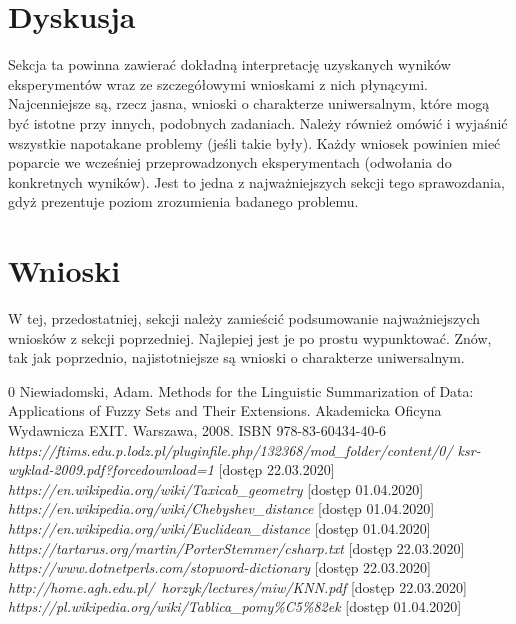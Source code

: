 \documentclass{classrep}
\begin{document}
\newpage
\newpage
\newpage
\section{Dyskusja} %
{\color{blue}
Sekcja ta powinna zawierać dokładną interpretację uzyskanych wyników
eksperymentów wraz ze szczegółowymi wnioskami z nich płynącymi. Najcenniejsze
są, rzecz jasna, wnioski o charakterze uniwersalnym, które mogą być istotne
przy innych, podobnych zadaniach. Należy również omówić i wyjaśnić wszystkie
napotakane problemy (jeśli takie były). Każdy wniosek powinien mieć poparcie
we wcześniej przeprowadzonych eksperymentach (odwołania do konkretnych
wyników). Jest to jedna z najważniejszych sekcji tego sprawozdania, gdyż
prezentuje poziom zrozumienia badanego problemu.}
\section{Wnioski}
{\color{blue}W tej, przedostatniej, sekcji należy zamieścić podsumowanie
najważniejszych wniosków z sekcji poprzedniej. Najlepiej jest je po prostu
wypunktować. Znów, tak jak poprzednio, najistotniejsze są wnioski o
charakterze uniwersalnym.}


\begin{thebibliography} {0}
 Niewiadomski, Adam. Methods for the Linguistic Summarization of Data: Applications of Fuzzy Sets and Their Extensions. Akademicka Oficyna Wydawnicza EXIT. Warszawa, 2008. ISBN 978-83-60434-40-6
 \textsl{https://ftims.edu.p.lodz.pl/pluginfile.php/132368/mod\_folder/content/0/
ksr-wyklad-2009.pdf?forcedownload=1} [dostęp 22.03.2020]
 \textsl{https://en.wikipedia.org/wiki/Taxicab\_geometry} [dostęp 01.04.2020]
 \textsl{https://en.wikipedia.org/wiki/Chebyshev\_distance} [dostęp 01.04.2020]
 \textsl{https://en.wikipedia.org/wiki/Euclidean\_distance} [dostęp 01.04.2020]
 \textsl{https://tartarus.org/martin/PorterStemmer/csharp.txt} [dostęp 22.03.2020]
 \textsl{https://www.dotnetperls.com/stopword-dictionary} [dostęp 22.03.2020]
 \textsl{http://home.agh.edu.pl/~horzyk/lectures/miw/KNN.pdf} [dostęp 22.03.2020]
 \textsl{https://pl.wikipedia.org/wiki/Tablica\_pomy\%C5\%82ek} [dostęp 01.04.2020]
\end{thebibliography}
\end{document}
